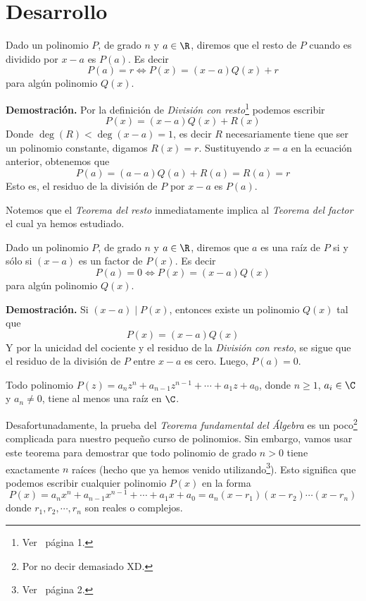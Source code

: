 \section{Desarrollo}

\begin{theorem}
    Dado un polinomio $P$, de grado $n$ y $a \in \R$, diremos que el resto de $P$ cuando es dividido por $x - a$ es $P(a)$.
    Es decir
    \[P(a)   = r \Leftrightarrow P(x) = (x-a)Q(x) + r\]
    para algún polinomio $Q(x).$

    \textbf{Demostración.} Por la definición de \textit{División con resto}\footnote{Ver~\cite{TD23-clase5} página 1.} podemos escribir
    \[P(x) = (x-a)Q(x) + R(x)\]
    Donde $\deg (R) < \deg(x - a) = 1$, es decir $R$ necesariamente tiene que ser un polinomio constante, digamos $R(x) = r$.
    Sustituyendo $x = a$ en la ecuación anterior, obtenemos que
    \[P(a) = (a - a)Q(a) + R(a) = R(a) = r\]
    Esto es, el residuo de la división de $P$ por $x - a$ es $P(a)$.
\end{theorem}

Notemos que el \textit{Teorema del resto} inmediatamente implica al \textit{Teorema del factor} el cual ya hemos estudiado.

\begin{theorem}
    Dado un polinomio $P$, de grado $n$ y $a \in \R$, diremos que $a$ es una raíz de $P$ si y sólo si $(x-a)$ es un factor de $P(x)$.
    Es decir
    \[P(a) = 0 \Leftrightarrow P(x) = (x-a)Q(x)\]
    para algún polinomio $Q(x).$

    \textbf{Demostración.} Si $(x - a) \mid P(x)$, entonces existe un polinomio $Q(x)$ tal que
    \[P(x) = (x-a)Q(x)\]
    Y por la unicidad del cociente y el residuo de la \textit{División con resto}, se sigue que el residuo de la división de $P$ entre $x - a$ es cero.
    Luego, $P(a) = 0$.
\end{theorem}

\begin{theorem}
    Todo polinomio $P(z) = a_n z^n + a_{n - 1} z^{n - 1} + \cdots + a_1 z + a_0$, donde $n \geq 1$, $a_i \in \C$ y $a_n \neq 0$, tiene al menos una raíz en $\C$.
\end{theorem}

Desafortunadamente, la prueba del \textit{Teorema fundamental del Álgebra} es un poco\footnote{Por no decir demasiado XD.} complicada para nuestro pequeño curso de polinomios.
Sin embargo, vamos usar este teorema para demostrar que todo polinomio de grado $n > 0$ tiene exactamente $n$ raíces (hecho que ya hemos venido utilizando\footnote{Ver~\cite{TD23-clase2} página 2.}).
Esto significa que podemos escribir cualquier polinomio $P(x)$ en la forma
\[P(x) = a_n x^n + a_{n - 1} x^{n - 1} + \cdots  + a_1 x + a_0 = a_n (x - r_1)(x - r_2) \cdots (x - r_n)\]
donde $r_1, r_2, \cdots, r_n$ son reales o complejos.

